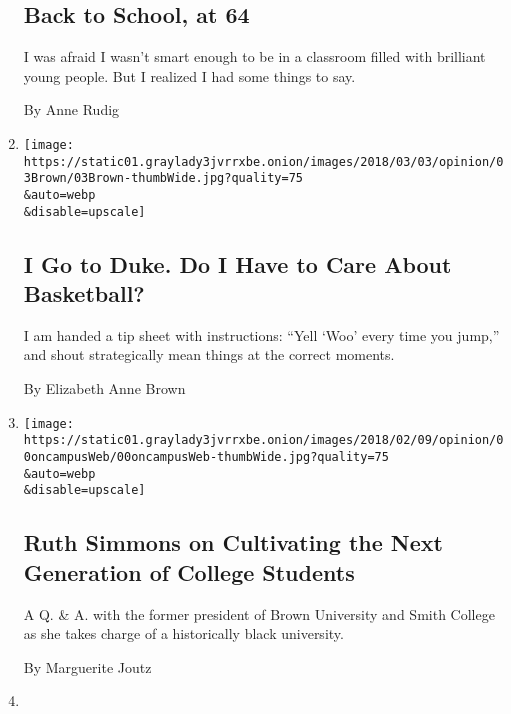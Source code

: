 \begin{enumerate}
  \hypertarget{back-to-school-at-64}{%
  \subsection{Back to School, at 64}\label{back-to-school-at-64}}

  I was afraid I wasn't smart enough to be in a classroom filled with
  brilliant young people. But I realized I had some things to say.

  By Anne Rudig
\item
  \href{/2018/03/02/opinion/duke-basketball-fans.html}{}

  \texttt{[image: https://static01.graylady3jvrrxbe.onion/images/2018/03/03/opinion/03Brown/03Brown-thumbWide.jpg?quality=75\\\&auto=webp\\\&disable=upscale]}

  \hypertarget{i-go-to-duke-do-i-have-to-care-about-basketball}{%
  \subsection{I Go to Duke. Do I Have to Care About
  Basketball?}\label{i-go-to-duke-do-i-have-to-care-about-basketball}}

  I am handed a tip sheet with instructions: ``Yell `Woo' every time you
  jump,'' and shout strategically mean things at the correct moments.

  By Elizabeth Anne Brown
\item
  \href{/2018/02/28/opinion/hbcu-ruth-simmons-interview.html}{}

  \texttt{[image: https://static01.graylady3jvrrxbe.onion/images/2018/02/09/opinion/00oncampusWeb/00oncampusWeb-thumbWide.jpg?quality=75\\\&auto=webp\\\&disable=upscale]}

  \hypertarget{ruth-simmons-on-cultivating-the-next-generation-of-college-students}{%
  \subsection{Ruth Simmons on Cultivating the Next Generation of College
  Students}\label{ruth-simmons-on-cultivating-the-next-generation-of-college-students}}

  A Q. \& A. with the former president of Brown University and Smith
  College as she takes charge of a historically black university.

  By Marguerite Joutz
\item
  \href{/2018/02/14/opinion/you-up-college-in-the-age-of-tinder.html}{}


\end{enumerate}
